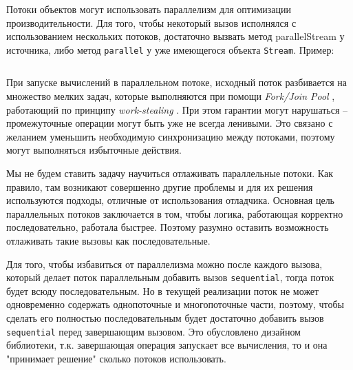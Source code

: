 Потоки объектов могут использовать параллелизм для оптимизации производительности. Для того, чтобы некоторый вызов исполнялся с использованием нескольких потоков, достаточно вызвать метод parallelStream у источника, либо метод \texttt{parallel} у уже имеющегося объекта \texttt{Stream}. Пример: 
\inputminted{java}{chapter2/code/ParallelStream.java}
При запуске вычислений в параллельном потоке, исходный поток разбивается на множество мелких задач, которые выполняются при помощи\textit{ Fork/Join Pool} \cite{java:forkjoin}, работающий по принципу \textit{work-stealing} \cite{wiki:worksteal}. При этом гарантии могут нарушаться -- промежуточные операции могут быть уже не всегда ленивыми. Это связано с желанием уменьшить необходимую синхронизацию между потоками, поэтому могут выполняться избыточные действия.

Мы не будем ставить задачу научиться отлаживать параллельные потоки. Как правило, там возникают совершенно другие проблемы и для их решения используются подходы, отличные от использования отладчика. Основная цель параллельных потоков заключается в том, чтобы логика, работающая корректно последовательно, работала быстрее. Поэтому разумно оставить возможность отлаживать такие вызовы как последовательные.

Для того, чтобы избавиться от параллелизма можно после каждого вызова, который делает поток параллельным добавить вызов \texttt{sequential}, тогда поток будет всюду последовательным. Но в текущей реализации поток не может одновременно содержать однопоточные и многопоточные части, поэтому, чтобы сделать его полностью последовательным будет достаточно добавить вызов \texttt{sequential} перед завершающим вызовом. Это обусловлено дизайном библиотеки, т.к. завершающая операция запускает все вычисления, то и она "принимает решение" сколько потоков использовать.
